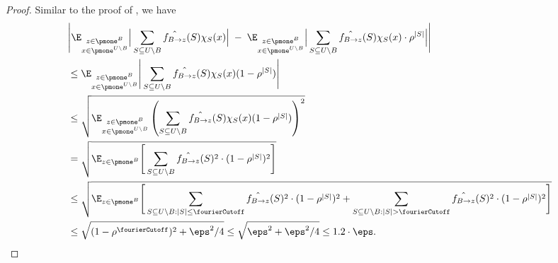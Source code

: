 \begin{proof}
Similar to the proof of , we have
\begin{align*}
   & \Bigg|\E_{\substack{z \in \pmone^{B}\\x \in \pmone^{U \setminus B}}}
     \Big | \sum_{S \subseteq U\setminus B} \hat{f_{B \to z}}(S)\chi_S(x)\Big|
     \;-\;\E_{\substack{z \in \pmone^{B}\\x \in \pmone^{U \setminus B}}}
     \Big |\sum_{\substack{S \subseteq U\setminus B}} \hat{f_{B \to z}}(S)\chi_S(x) \cdot \rho^{|S|}\Big|\Bigg|     \\
      &\le 
\E_{\substack{z \in \pmone^{B}\\x \in \pmone^{U \setminus B}}}
     \Bigg |\sum_{\substack{S \subseteq U\setminus B}} \hat{f_{B \to z}}(S)\chi_S(x) (1-\rho^{|S|}) \Bigg|\\
     &\le \sqrt{\E_{\substack{z \in \pmone^{B}\\x \in \pmone^{U \setminus B}}}
    \left(\sum_{\substack{S \subseteq U\setminus B}} \hat{f_{B \to z}}(S)\chi_S(x) (1-\rho^{|S|})\right)^2} 
    \\&= \sqrt{\E_{z \in \pmone^{B}}\Bigg[\sum_{\substack{S\subseteq U\setminus B}}\hat{f_{B\to z}}(S)^2\cdot (1-\rho^{|S|})^2\Bigg]} \\
    &\leq 
    \sqrt{\E_{z \in \pmone^{B}}\Bigg[\sum_{\substack{S\subseteq U\setminus B:|S|\le \fourierCutoff}}\hat{f_{B\to z}}(S)^2\cdot (1-\rho^{|S|})^2 + \sum_{\substack{S\subseteq U\setminus B:|S|> \fourierCutoff}}\hat{f_{B\to z}}(S)^2\cdot (1-\rho^{|S|})^2\Bigg]}\\
    &\le\sqrt{ (1-\rho^{\fourierCutoff})^2 + \eps^2/4} 
    \le \sqrt{ \eps^2 + \eps^2/4} \le 1.2 \cdot \eps.\qedhere
     \end{align*}
\end{proof}

